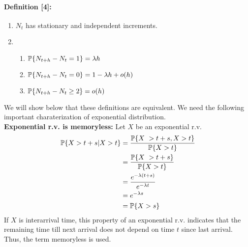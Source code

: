 \documentclass[all-lectures.tex]{subfiles}
\begin{document}
\paragraph{Definition [4]:}{
\begin{enumerate}
\item $N_t$ has stationary and independent increments.
\item \begin{enumerate}
\item $\P\{N_{t+h} - N_{t}  = 1 \}= \lambda h$
\item $\P\{N_{t+h} - N_{t}  = 0 \}= 1 - \lambda h + o(h)$
\item $\P\{N_{t+h} - N_{t}  \geq 2 \}= o(h)$
\end{enumerate}
\end{enumerate}
}
We will show below that these definitions are equivalent. We need the following important charaterization of exponential distribution.\\ 
\textbf{Exponential r.v. is memoryless:} Let $X$ be an exponential r.v.
\begin{align*}
\P\{X > t+s|X>t\} &= \frac{\P\{X\ > t+s,X>t\}}{\P\{X>t\}} \\
&= \frac{\P\{X\ > t+s\}}{\P\{X>t\}} \\
&= \frac{e^{-\lambda (t+s)}}{e^{-\lambda t}} \\
&= e^{-\lambda s} \\
&= \P\{X > s\} 
\end{align*}
If $X$ is interarrival time, this property of an exponential r.v. indicates that the remaining time till next arrival does not depend on time $t$ since last arrival. Thus, the term memoryless is used.
\end{document}
